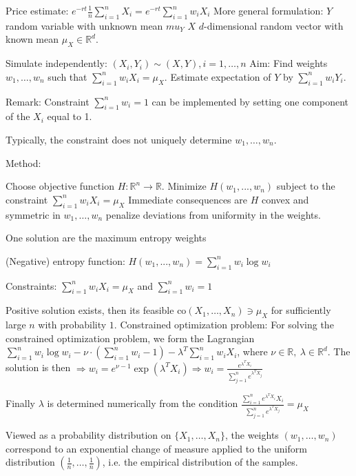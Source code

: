 Price estimate:
\( e^{-rt} \frac{1}{n} \sum_{i=1}^{n} X_i = e^{-rt} \sum_{i=1}^{n} w_i X_i \)
More general formulation: \( Y \) random variable with unknown mean \(mu_Y \)
\( X\) \(d\)-dimensional random vector with known mean \(\mu_X \in \mathbb{R}^d \).

Simulate independently: \( (X_i, Y_i) \sim (X, Y), i = 1, \dots, n\)
Aim: Find weights \( w_1, \dots, w_n\) such that \(\sum_{i=1}^{n} w_i X_i = \mu_X\). 
Estimate expectation of \( Y \) by \(\sum_{i=1}^{n} w_i Y_i \).

Remark: Constraint \( \sum_{i=1}^{n} w_i = 1\) 
can be implemented by setting one component of the \( X_i \) equal to 1.

Typically, the constraint does not uniquely determine \( w_1, \dots, w_n \).

Method:

Choose objective function \( H: \mathbb{R}^n \rightarrow \mathbb{R} \).
Minimize \( H(w_1,..., w_n) \) subject to the constraint \(\sum_{i=1}^{n} w_i X_i = \mu_X\)
Immediate consequences are \( H \) convex and symmetric in \(w_1,\dots, w_n\) penalize deviations from uniformity in the weights.

One solution are the maximum entropy weights

(Negative) entropy function: \( H(w_1, ..., w_n) = \sum_{i=1}^{n} w_i \log w_i \)

Constraints: \(\sum_{i=1}^{n} w_i X_i = \mu_X\) and \( \sum_{i=1}^{n} w_i = 1 \)

Positive solution exists, then its feasible \( \text{co}(X_1, \dots, X_n) \ni \mu_X \) for sufficiently large \( n \) with probability \( 1 \).
Constrained optimization problem:
For solving the constrained optimization problem, we form the Lagrangian
\( \sum_{i=1}^{n} w_i \log w_i - \nu \cdot (\sum_{i=1}^{n} w_i - 1) - \lambda^T \sum_{i=1}^{n} w_i X_i \),
where \( \nu \in \mathbb{R},\ \lambda \in \mathbb{R}^d\).
The solution is then
\( \Rightarrow w_i = e^{\nu - 1} \exp(\lambda^T X_i) \Rightarrow w_i = \frac{e^{\lambda^T X_i}}{\sum_{j=1}^{n} e^{\lambda^T X_j}} \)

Finally \( \lambda \) is determined numerically from the condition
\( \frac{\sum_{i=1}^{n} e^{\lambda^T X_i} X_i}{\sum_{j=1}^{n} e^{\lambda^T X_j}} = \mu_X \)

Viewed as a probability distribution on \( \{X_1, \dots, X_n\} \), the weights \( (w_1, \dots, w_n) \)  correspond to an exponential
change of measure applied to the uniform distribution \( (\frac{1}{n}, \dots, \frac{1}{n}) \), i.e. the empirical distribution of the samples.

